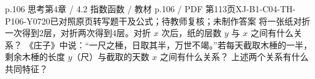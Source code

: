 \par\noindent\begin{minipage}{\linewidth}
\begin{bankitem}{p.106 思考}{第4章 / 4.2 指数函数 / 教材 p.106 / PDF 第113页}{XJ-B1-C04-TH-P106-Y0720}{已对照原页转写题干及公式；待教师复核；未制作答案}
将一张纸对折一次得到2层，对折两次得到4层。对折 $x$ 次后，纸的层数 $y$ 与 $x$ 之间有什么关系？
《庄子》中说：“一尺之棰，日取其半，万世不竭。”若每天截取木棰的一半，剩余木棰的长度 $y$（尺）与截取的天数 $x$ 之间有什么关系？
上述两个关系有什么共同特征？
\end{bankitem}
\end{minipage}\par\medskip
